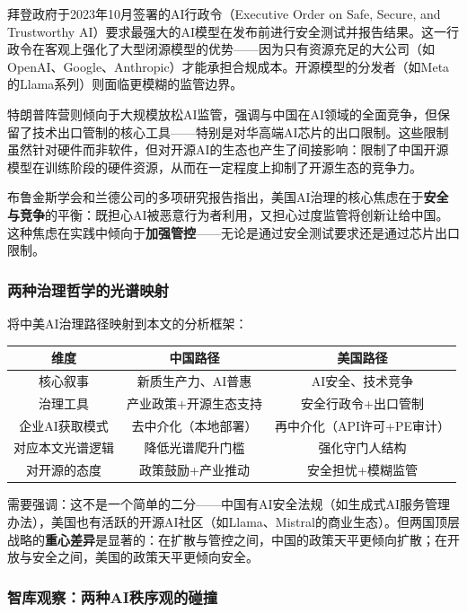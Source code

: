 \documentclass[12pt,a4paper]{ctexart}
\begin{document}
拜登政府于2023年10月签署的AI行政令（Executive Order on Safe, Secure, and Trustworthy AI）要求最强大的AI模型在发布前进行安全测试并报告结果。这一行政令在客观上强化了大型闭源模型的优势——因为只有资源充足的大公司（如OpenAI、Google、Anthropic）才能承担合规成本。开源模型的分发者（如Meta的Llama系列）则面临更模糊的监管边界。

特朗普阵营则倾向于大规模放松AI监管，强调与中国在AI领域的全面竞争，但保留了技术出口管制的核心工具——特别是对华高端AI芯片的出口限制。这些限制虽然针对硬件而非软件，但对开源AI的生态也产生了间接影响：限制了中国开源模型在训练阶段的硬件资源，从而在一定程度上抑制了开源生态的竞争力。

布鲁金斯学会和兰德公司的多项研究报告指出，美国AI治理的核心焦虑在于\textbf{安全与竞争}的平衡：既担心AI被恶意行为者利用，又担心过度监管将创新让给中国。这种焦虑在实践中倾向于\textbf{加强管控}——无论是通过安全测试要求还是通过芯片出口限制。

\subsubsection{两种治理哲学的光谱映射}

将中美AI治理路径映射到本文的分析框架：

\begin{center}
\begin{tabular}{c|c|c}
\hline
维度 & 中国路径 & 美国路径 \\
\hline
核心叙事 & 新质生产力、AI普惠 & AI安全、技术竞争 \\
治理工具 & 产业政策+开源生态支持 & 安全行政令+出口管制 \\
企业AI获取模式 & 去中介化（本地部署）& 再中介化（API许可+PE审计） \\
对应本文光谱逻辑 & 降低光谱爬升门槛 & 强化守门人结构 \\
对开源的态度 & 政策鼓励+产业推动 & 安全担忧+模糊监管 \\
\hline
\end{tabular}
\end{center}

需要强调：这不是一个简单的二分——中国有AI安全法规（如生成式AI服务管理办法），美国也有活跃的开源AI社区（如Llama、Mistral的商业生态）。但两国顶层战略的\textbf{重心差异}是显著的：在扩散与管控之间，中国的政策天平更倾向扩散；在开放与安全之间，美国的政策天平更倾向安全。


\subsubsection{智库观察：两种AI秩序观的碰撞}
\end{document}
